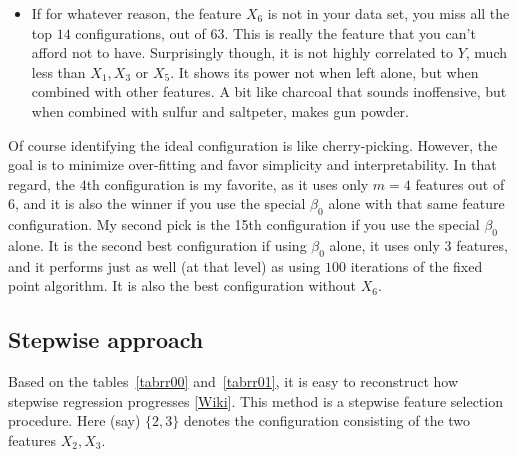 \documentclass[oneside,10pt]{book}
\begin{document}
\begin{itemize}
\item If for whatever reason, the feature $X_6$ is not in your data set, you miss all the top $14$ configurations, out of $63$. This is really the feature that you can't afford not to have. Surprisingly though, it is not highly correlated to $Y$, much less than $X_1, X_3$ or $X_5$. It shows its power not when left alone, but when combined
with other features. A bit like charcoal that sounds inoffensive, but when combined with sulfur and saltpeter, makes gun powder.
\end{itemize}
Of course identifying the ideal configuration is like cherry-picking. However, the goal is to minimize over-fitting and favor simplicity and interpretability. In that regard, the $4$th configuration is my favorite, as it uses only $m=4$ features out of $6$, and it is also the winner if you use the special $\beta_0$ alone with that same feature configuration. My second pick is the 15th configuration if you use the special $\beta_0$ alone. It is the second best configuration if using $\beta_0$ alone, it uses only $3$ features, and it performs just as well (at that level) as using $100$ iterations of the fixed point algorithm. It is also the best configuration without $X_6$.

\subsection{Stepwise approach}\label{stepw}

Based on the tables~\ref{tabrr00} and~\ref{tabrr01}, it is easy to reconstruct how \textcolor{index}{stepwise regression} progresses [\href{https://en.wikipedia.org/wiki/Stepwise_regression}{Wiki}].  This method is a stepwise feature
selection procedure. Here (say) $\{2,3\}$ denotes the configuration consisting of the two features $X_2, X_3$.
\end{document}

